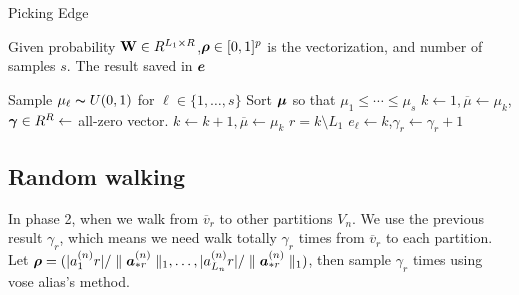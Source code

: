 \documentclass{article}
\newcommand{\V}[1]{{\bm{{\MakeLowercase{#1}}}}}%
\newcommand{\Vacol}[1]{\V{a}^{(#1)}_{*r}}
\newcommand{\M}[1]{{\bm{\mathbf{\MakeUppercase{#1}}}}}%
\newcommand{\norm}[2]{\parallel#1\parallel_{#2}}
\begin{document}
\begin{algorithm}[t]
    \caption{Picking Edge}
    \label{alg:Pickedge}
    Given probability $\M{W}\in R^{L_1\times R}$,$\V{\rho}\in[0,1]^p$ is the vectorization, and number of samples $s$.
    The result saved in $\V{e}$
    \begin{algorithmic}[1]
    \State Sample $\mu_{\ell} \thicksim U(0,1)$ for $\ell \in \{1,\ldots,s\}$
    \State Sort $\V{\mu}$ so that $\mu_1 \leq \cdots\leq\mu_s$
    \State $k \leftarrow 1,\overline{\mu} \leftarrow \mu_k$,$\V{\gamma}\in R^R\leftarrow$ all-zero vector.
    \While {$\mu_{\ell} > \overline{\mu}$}
    \State $k \leftarrow k+1,\overline{\mu} \leftarrow \mu_k$
    \EndWhile
    \State $r = k \setminus L_1$
    \State $e_{\ell}\leftarrow k$,$\gamma_{r}\leftarrow \gamma_{r} + 1$
    \EndFor
    \end{algorithmic}
\end{algorithm}
\subsection{Random walking}

In phase 2, when we walk from $\overline{v}_r$ to other partitions $V_n$. We use the previous result $\gamma_{r}$, which means we need walk totally $\gamma_{r}$ times from $\overline{v}_r$ to each  partition. Let $\V{\rho} = (|{a}^{(n)}_{1}{r}|/\norm{\Vacol{n}}{1},\ldots,|{a}^{(n)}_{L_n}{r}|/\norm{\Vacol{n}}{1})$, then sample $\gamma_{r}$ times using vose alias's method.
\end{document}
